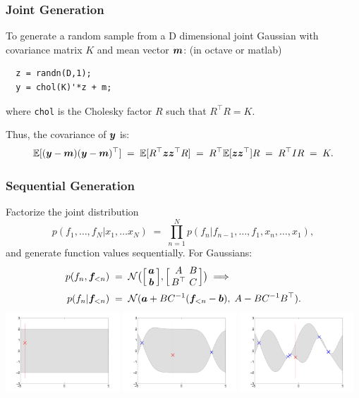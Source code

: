 \begin{frame}[fragile]
\frametitle{Joint Generation}

To generate a random sample from a D dimensional joint Gaussian with
covariance matrix $K$ and mean vector $\bm m$: (in octave or matlab)

\begin{verbatim}
  z = randn(D,1);
  y = chol(K)'*z + m;
\end{verbatim}

where \texttt{chol} is the Cholesky factor $R$ such that $R^\top R=K$.

Thus, the covariance of $\bm y$ is:
\[
\mathbb{E}[(\bm y-\bm m)(\bm y-\bm m)^\top]\;=\;\mathbb{E}[R^\top\bm z
\bm z^\top R]\;=\;R^\top\mathbb{E}[\bm z\bm z^\top]R\;=\;R^\top IR\;=\;K.
\]
\end{frame}


\begin{frame}
\frametitle{Sequential Generation}

Factorize the joint distribution
\[
p(f_1,\ldots,f_N|x_1,\ldots x_N)\;=\;\prod_{n=1}^N
p(f_n|f_{n-1},\ldots,f_1,x_n,\ldots,x_1),
\]
and generate function values sequentially. For Gaussians:
\begin{align*}
p(f_n,\bff_{<n})&\;=\;{\cal N}\big(\Big[\!\!\begin{array}{c}\bfa \\ \bfb
\end{array}\!\!\Big],\Big[\!\!\begin{array}{cc}A\!\!&\!\!B \\ B^\top\!\!&\!\!C\end{array}\!\!\Big]\big)
\;\Longrightarrow\\
p(f_n|\bff_{<n})&\;=\;{\cal N}(\bfa+BC^{-1}(\bff_{<n}-\bfb),\; A-BC^{-1}B^\top).
\end{align*}
\includegraphics[width=0.32\textwidth]{seq_fullGP_M1.pdf}
\includegraphics[width=0.32\textwidth]{seq_fullGP_M3.pdf}
\includegraphics[width=0.32\textwidth]{seq_fullGP_M7.pdf}
\end{frame}


